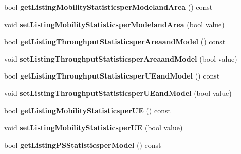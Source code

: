 \begin{DoxyCompactItemize}
\item 
bool {\bfseries get\+Listing\+Mobility\+Statisticsper\+Modeland\+Area} () const \hypertarget{class_statistics_ada853bdd47748d1108d2b633c9b994e0}{}\label{class_statistics_ada853bdd47748d1108d2b633c9b994e0}

\item 
void {\bfseries set\+Listing\+Mobility\+Statisticsper\+Modeland\+Area} (bool value)\hypertarget{class_statistics_a6716bb8a2d951bd1d7205c190ad8ee36}{}\label{class_statistics_a6716bb8a2d951bd1d7205c190ad8ee36}

\item 
bool {\bfseries get\+Listing\+Throughput\+Statisticsper\+Areaand\+Model} () const \hypertarget{class_statistics_aafda2d22742e68f5a3509a3cf00753c6}{}\label{class_statistics_aafda2d22742e68f5a3509a3cf00753c6}

\item 
void {\bfseries set\+Listing\+Throughput\+Statisticsper\+Areaand\+Model} (bool value)\hypertarget{class_statistics_ad884d995d4a05046e132c80b9d83c06f}{}\label{class_statistics_ad884d995d4a05046e132c80b9d83c06f}

\item 
bool {\bfseries get\+Listing\+Throughput\+Statisticsper\+U\+Eand\+Model} () const \hypertarget{class_statistics_a8014b71d5d45c991b4ae29507ecb18a0}{}\label{class_statistics_a8014b71d5d45c991b4ae29507ecb18a0}

\item 
void {\bfseries set\+Listing\+Throughput\+Statisticsper\+U\+Eand\+Model} (bool value)\hypertarget{class_statistics_a261c3c51ff5c387669807edbe9ff93f4}{}\label{class_statistics_a261c3c51ff5c387669807edbe9ff93f4}

\item 
bool {\bfseries get\+Listing\+Mobility\+Statisticsper\+UE} () const \hypertarget{class_statistics_aaf554edfa947fc98b79f3983ddea8b82}{}\label{class_statistics_aaf554edfa947fc98b79f3983ddea8b82}

\item 
void {\bfseries set\+Listing\+Mobility\+Statisticsper\+UE} (bool value)\hypertarget{class_statistics_a6e7fa4717b55f4d35e094d7660de649d}{}\label{class_statistics_a6e7fa4717b55f4d35e094d7660de649d}

\item 
bool {\bfseries get\+Listing\+P\+S\+Statisticsper\+Model} () const \hypertarget{class_statistics_ad90788e36c8a806eca98dbc2f4c965a2}{}\label{class_statistics_ad90788e36c8a806eca98dbc2f4c965a2}


\end{DoxyCompactItemize}

